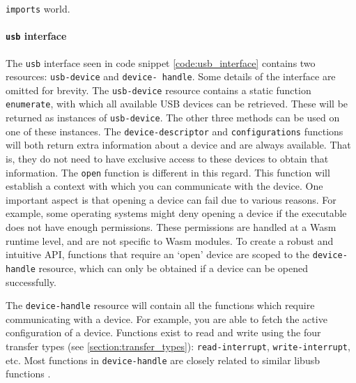 \newpage

\begin{code}

\caption{\texttt{imports} world.}
\label{code:world}
\end{code}

\paragraph{\texttt{usb} interface}
The \texttt{usb} interface seen in code snippet \ref{code:usb_interface} contains two resources: \texttt{usb-device} and \texttt{device- handle}. Some details of the interface are omitted for brevity. The \texttt{usb-device} resource contains a static function \texttt{enumerate}, with which all available USB devices can be retrieved. These will be returned as instances of \texttt{usb-device}. The other three methods can be used on one of these instances. The \texttt{device-descriptor} and \texttt{configurations} functions will both return extra information about a device and are always available. That is, they do not need to have exclusive access to these devices to obtain that information. The \texttt{open} function is different in this regard. This function will establish a context with which you can communicate with the device. One important aspect is that opening a device can fail due to various reasons. For example, some operating systems might deny opening a device if the executable does not have enough permissions. These permissions are handled at a \acrshort{Wasm} runtime level, and are not specific to \acrshort{Wasm} modules. To create a robust and intuitive \acrshort{API}, functions that require an `open' device are scoped to the \texttt{device-handle} resource, which can only be obtained if a device can be opened successfully.

The \texttt{device-handle} resource will contain all the functions which require communicating with a device. For example, you are able to fetch the active configuration of a device. Functions exist to read and write using the four transfer types (see \ref{section:transfer_types}): \texttt{read-interrupt}, \texttt{write-interrupt}, etc. Most functions in \texttt{device-handle} are closely related to similar libusb functions \cite{libusb_docs}. \\

